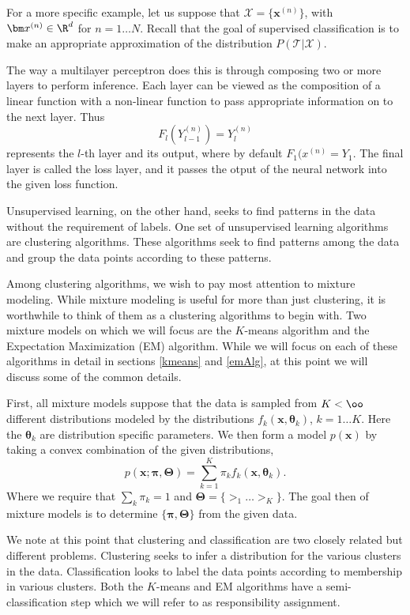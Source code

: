 For a more specific example, let us suppose that 
\(\mathcal{X}=\{\bm x^{(n)}\}\), with \(\bm x^{(n)}\in \R^d\) for 
\(n=1\ldots N\). Recall that the goal of supervised classification is to make 
an appropriate approximation of the distribution 
\(P(\mathcal{T}|\mathcal{X})\). 

The way a multilayer perceptron does this is through composing two or more
layers to perform inference.  Each layer can be viewed as the composition of a 
linear function with a non-linear function to pass appropriate information on 
to the next layer.  Thus \[F_l(Y^{(n)}_{l-1}) = Y^{(n)}_{l}\] represents the 
\(l\)-th layer and its output, where by default \(F_1(x^{(n)}=Y_1\).
The final layer is called the loss layer, and it passes the otput of the 
neural network into the given loss function.

\label{unsupLearning}
Unsupervised learning, on the other hand, seeks to find patterns in the data
without the requirement of labels.  One set of unsupervised learning 
algorithms are clustering algorithms.  These algorithms seek to find patterns 
among the data and group the data points according to these patterns. 

Among clustering algorithms, we wish to pay most attention to mixture modeling.
While mixture modeling is useful for more than just clustering, it is 
worthwhile to think of them as a clustering algorithms to begin with.  Two 
mixture models on which we will focus are the $K$-means algorithm and the 
Expectation Maximization (EM) algorithm.  While we will focus on each of these 
algorithms in detail in sections \ref{kmeans} and \ref{emAlg}, at this point 
we will discuss some of the common details.

First, all mixture models suppose that the data is sampled from $K<\oo$ 
different distributions modeled by the distributions 
$f_k(\bm x,\bm \theta_k)$, $k=1\ldots K$. Here the $\bm\theta_k$ are 
distribution specific parameters. We then form a model $p(\bm x)$ by taking a 
convex combination of the given distributions,
\[p(\bm x;\bm\pi,\bm\Theta)=\sum_{k=1}^{K}\pi_kf_k(\bm x,\bm\theta_k).\]
Where we require that $\sum_k \pi_k =1$ and 
$\bm\Theta = \{\bm\gt_1\ldots\bm\gt_K\}$. The goal then of mixture models is 
to determine $\{\bm\pi,\bm\Theta\}$ from the given data.

We note at this point that clustering and classification are two closely 
related but different problems. Clustering seeks to infer a distribution for 
the various clusters in the data. Classification looks to label the data 
points according to membership in various clusters. Both the $K$-means and EM 
algorithms have a semi-classification step which we will refer to as 
responsibility assignment. \cite{BishopBook,MML_2019,MacKay2002}

